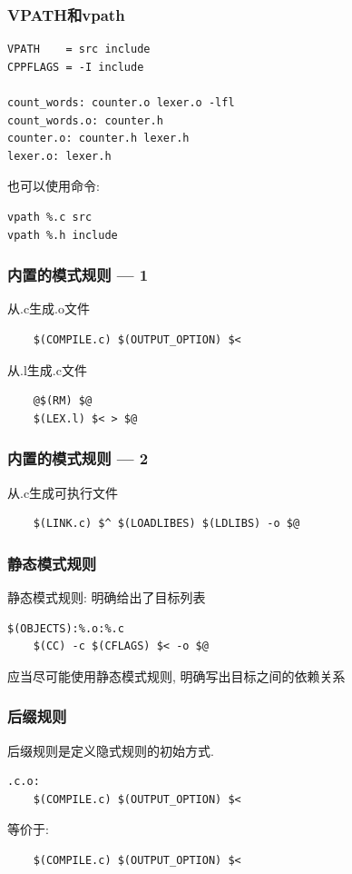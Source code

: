 \documentclass[compress]{beamer}
\begin{document}
\begin{frame}[containsverbatim]
\frametitle{VPATH和vpath}

\begin{Verbatim}
VPATH    = src include
CPPFLAGS = -I include

count_words: counter.o lexer.o -lfl
count_words.o: counter.h
counter.o: counter.h lexer.h
lexer.o: lexer.h
\end{Verbatim}

也可以使用命令:
\begin{Verbatim}
vpath %.c src
vpath %.h include
\end{Verbatim}

\end{frame}

\begin{frame}[containsverbatim]
\frametitle{内置的模式规则 --- 1}
从.c生成.o文件\\
\begin{Verbatim}[showtabs=true]
%.o:%.c
	$(COMPILE.c) $(OUTPUT_OPTION) $<
\end{Verbatim}
从.l生成.c文件\\
\begin{Verbatim}[showtabs=true]
%.c:%.l
	@$(RM) $@
	$(LEX.l) $< > $@
\end{Verbatim}

\end{frame}

\begin{frame}[containsverbatim]
\frametitle{内置的模式规则 --- 2}

从.c生成可执行文件\\
\begin{Verbatim}[showtabs=true]
%:%.c
	$(LINK.c) $^ $(LOADLIBES) $(LDLIBS) -o $@
\end{Verbatim}
\end{frame}

\begin{frame}[containsverbatim]
\frametitle{静态模式规则}

静态模式规则: 明确给出了目标列表\\
\begin{Verbatim}[showtabs=true]
$(OBJECTS):%.o:%.c
	$(CC) -c $(CFLAGS) $< -o $@
\end{Verbatim}

应当尽可能使用静态模式规则, 明确写出目标之间的依赖关系

\end{frame}

\begin{frame}[containsverbatim]
\frametitle{后缀规则}
后缀规则是定义隐式规则的初始方式.\\[1ex]
\begin{Verbatim}[showtabs=true]
.c.o:
    $(COMPILE.c) $(OUTPUT_OPTION) $<
\end{Verbatim}
等价于:
\begin{Verbatim}[showtabs=true]
%.o:%.c
    $(COMPILE.c) $(OUTPUT_OPTION) $<
\end{Verbatim}

\end{frame}
\end{document}
